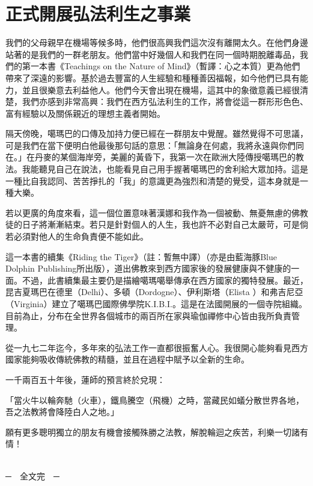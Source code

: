 \chapter{正式開展弘法利生之事業}

我們的父母親早在機場等候多時，他們很高興我們這次沒有離開太久。在他們身邊站著的是我們的一群老朋友。他們當中好幾個人和我們在同一個時期脫離毒品，我們的第一本書《Teachings
on the Nature of
Mind》（暫譯：心之本質）更為他們帶來了深遠的影響。基於過去豐富的人生經驗和種種善因福報，如今他們已具有能力，並且很樂意去利益他人。他們今天會出現在機場，這其中的象徵意義已經很清楚，我們亦感到非常高興：我們在西方弘法利生的工作，將會從這一群形形色色、富有經驗以及關係親近的理想主義者開始。

隔天傍晚，噶瑪巴的口傳及加持力便已經在一群朋友中覺醒。雖然覺得不可思議，可是我們在當下便明白他最後那句話的意思：「無論身在何處，我將永遠與你們同在。」在丹麥的某個海岸旁，美麗的黃昏下，我第一次在歐洲大陸傳授噶瑪巴的教法。我能聽見自己在說法，也能看見自己用手握著噶瑪巴的舍利給大眾加持。這是一種比自我認同、苦苦掙扎的「我」的意識更為強烈和清楚的覺受，這本身就是一種大樂。

若以更廣的角度來看，這一個位置意味著漢娜和我作為一個被動、無憂無慮的佛教徒的日子將漸漸結束。若只是針對個人的人生，我也許不必對自己太嚴苛，可是倘若必須對他人的生命負責便不能如此。

這一本書的續集《Riding the Tiger》（註：暫無中譯）（亦是由藍海豚Blue
Dolphin
Publishing所出版），道出佛教來到西方國家後的發展健康與不健康的一面。不過，此書續集最主要仍是描繪噶瑪噶舉傳承在西方國家的獨特發展。最近，昆吉夏瑪巴在德里（Delhi）、多頓（Dordogne）、伊利斯塔（Elista
）和弗吉尼亞（Virginia）建立了噶瑪巴國際佛學院K.I.B.I.。這是在法國開展的一個寺院組織。目前為止，分布在全世界各個城市的兩百所在家與瑜伽禪修中心皆由我所負責管理。

從一九七二年迄今，多年來的弘法工作一直都很振奮人心。我很開心能夠看見西方國家能夠吸收傳統佛教的精髓，並且在過程中賦予以全新的生命。

一千兩百五十年後，蓮師的預言終於兌現：

「當火牛以輪奔馳（火車），鐵鳥騰空（飛機）之時，當藏民如蟻分散世界各地，吾之法教將會降陸白人之地。」

願有更多聰明獨立的朋友有機會接觸殊勝之法教，解脫輪迴之疾苦，利樂一切諸有情！

　　　　　　　　　　　　　　　　　　　　　　　　　　　　　　　　　　　　　　─　全文完　─
